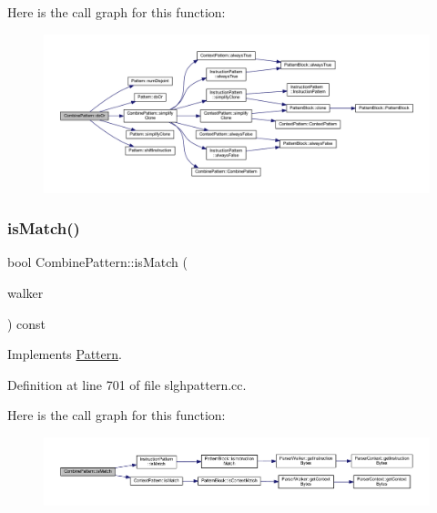 Here is the call graph for this function\+:
\nopagebreak
\begin{figure}[H]
\begin{center}
\leavevmode
\includegraphics[width=350pt]{class_combine_pattern_acc261bd115b31b7f004d5766702e5412_cgraph}
\end{center}
\end{figure}
\mbox{\label{class_combine_pattern_a89e54d4844001bc9a4916bb643e00fba}} 
\subsubsection{\texorpdfstring{isMatch()}{isMatch()}}
{\footnotesize\ttfamily bool Combine\+Pattern\+::is\+Match (\begin{DoxyParamCaption}\item[{\mbox{\hyperlink{class_parser_walker}{Parser\+Walker}} \&}]{walker }\end{DoxyParamCaption}) const\hspace{0.3cm}{\ttfamily [virtual]}}



Implements \mbox{\hyperlink{class_pattern_a2a85729a1c78a4905bd6ee1d11ea59d5}{Pattern}}.



Definition at line 701 of file slghpattern.\+cc.

Here is the call graph for this function\+:
\nopagebreak
\begin{figure}[H]
\begin{center}
\leavevmode
\includegraphics[width=350pt]{class_combine_pattern_a89e54d4844001bc9a4916bb643e00fba_cgraph}
\end{center}
\end{figure}
\mbox{\label{class_combine_pattern_a4d72e9c16ce072982379a9da0bf2ad78}} 
